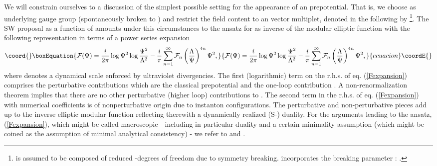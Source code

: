 \documentclass[a4paper,12pt]{article}
\begin{document}
We will constrain ourselves to a discussion of the simplest 
possible setting for the appearance of an \coordHE{} prepotential. 
That is, we choose \coordHE{} as underlying gauge group (spontaneously 
broken to \coordHE{}) and restrict the field content to an \coordHE{} 
vector multiplet, denoted in the following by \myHighlight{$\Psi$}\coordHE{} \footnote{\myHighlight{$\Psi$}\coordHE{} 
is assumed to be composed of 
reduced \coordHE{}-degrees of freedom due to symmetry breaking. \myHighlight{$\Psi$}\coordHE{} 
incorporates the breaking parameter \coordHE{} : \coordHE{}.}. 
The SW proposal  \coordHE{} as a function of \myHighlight{$\Psi$}\coordHE{} amounts under this 
circumstances to the ansatz for \coordHE{} as inverse of the  modular 
elliptic function \coordHE{} \cite{erdelyi} with the following representation 
in terms of a power series expansion
\begin{equation}\coord{}\boxEquation{
{\cal F}(\Psi)=\frac{i}{2\pi} \log \Psi^2\log \frac{\Psi^2}{\Lambda^2} 
-\frac{i}{\pi}\sum_{n=1}^{\infty}{\cal F}_n \left(\frac{\Lambda}{\Psi}
\right)^{4n} \Psi^2, 
\label{Fexpansion}
}{
{\cal F}(\Psi)=\frac{i}{2\pi} \log \Psi^2\log \frac{\Psi^2}{\Lambda^2} 
-\frac{i}{\pi}\sum_{n=1}^{\infty}{\cal F}_n \left(\frac{\Lambda}{\Psi}
\right)^{4n} \Psi^2, 
}{ecuacion}\coordE{}\end{equation}   
where \myHighlight{$\Lambda$}\coordHE{} denotes a dynamical scale enforced by ultraviolet 
divergencies. The first (logarithmic) term on the r.h.s. of eq. 
(\ref{Fexpansion}) comprises the perturbative contributions which 
are the classical prepotential \myHighlight{$\sim$}\coordHE{}  \coordHE{} and the one-loop 
contribution \myHighlight{$\sim$}\coordHE{}  \coordHE{}. A non-renormalization 
theorem \cite{s2} implies that there are no other perturbative 
(higher loop) contributions to \coordHE{}. 
The second term in the r.h.s. of eq. (\ref{Fexpansion}) with 
numerical coefficients \coordHE{} is of nonperturbative origin 
due to instanton configurations. The perturbative and non-perturbative 
pieces add up to the inverse elliptic modular function reflecting 
therewith a dynamically realized (S-) duality. For the arguments 
leading to the ansatz, (\ref{Fexpansion}), which might be called 
macroscopic - including in particular duality and a certain 
minimality assumption (which might be coined as the assumption of minimal 
analytical consistency) \cite{flume} - 
we refer to \cite{sw1} and \cite{sw2}. 
\end{document}
